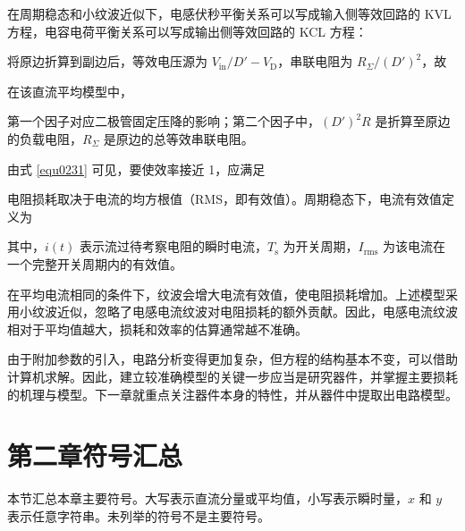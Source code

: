 在周期稳态和小纹波近似下，电感伏秒平衡关系可以写成输入侧等效回路的 KVL 方程，电容电荷平衡关系可以写成输出侧等效回路的 KCL 方程：


将原边折算到副边后，等效电压源为 $V_{\mathrm{in}}/D'-V_{\mathrm{D}}$，串联电阻为 $R_{\Sigma}/(D')^2$，故



在该直流平均模型中，

第一个因子对应二极管固定压降的影响；第二个因子中，$(D')^2R$ 是折算至原边的负载电阻，$R_{\Sigma}$ 是原边的总等效串联电阻。

由式 \eqref{equ0231} 可见，要使效率接近 1，应满足


电阻损耗取决于电流的均方根值（RMS，即有效值）。周期稳态下，电流有效值定义为

其中，$i(t)$ 表示流过待考察电阻的瞬时电流，$T_{\mathrm{s}}$ 为开关周期，$I_{\mathrm{rms}}$ 为该电流在一个完整开关周期内的有效值。

在平均电流相同的条件下，纹波会增大电流有效值，使电阻损耗增加。上述模型采用小纹波近似，忽略了电感电流纹波对电阻损耗的额外贡献。因此，电感电流纹波相对于平均值越大，损耗和效率的估算通常越不准确。

由于附加参数的引入，电路分析变得更加复杂，但方程的结构基本不变，可以借助计算机求解。因此，建立较准确模型的关键一步应当是研究器件，并掌握主要损耗的机理与模型。下一章就重点关注器件本身的特性，并从器件中提取出电路模型。

\clearpage

\section{第二章符号汇总}

本节汇总本章主要符号。大写表示直流分量或平均值，小写表示瞬时量，$x$ 和 $y$ 表示任意字符串。未列举的符号不是主要符号。


